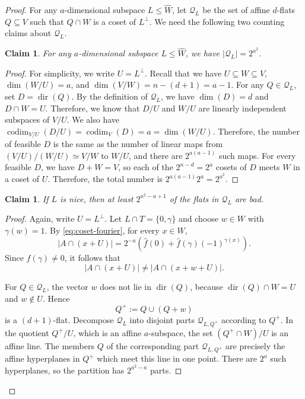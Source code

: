 \documentclass[reqno]{amsart}
\newtheorem{claim}[theorem]{Claim}
\theoremstyle{definition}
\theoremstyle{remark}
\newcommand{\cQ}{\mathcal Q}
\DeclareMathOperator{\dir}{dir}
\DeclareMathOperator{\codim}{codim}
\begin{document}
\begin{proof}
For any $a$-dimensional subspace $L\le\widehat W$, let $\cQ_L$ be the set of affine $d$-flats $Q\subseteq V$ such that $Q\cap W$ is a coset of $L^\perp$. We need the following two counting claims about $\cQ_L$.

\begin{claim}\label{claim:extensions}
For any $a$-dimensional subspace $L\le\widehat W$, we have $|\cQ_L|=2^{a^2}$.
\end{claim}

\begin{proof}
For simplicity, we write $U=L^\perp$. Recall that we have $U\subseteq W\subseteq V$,  $\dim(W/U)=a$, and $\dim(V/W)=n-(d+1)=a-1$. For any $Q\in\cQ_L$, set $D=\dir(Q)$. By the definition of $\cQ_L$, we have $\dim(D)=d$ and $D\cap W=U$. Therefore, we know that $D/U$ and $W/U$ are linearly independent subspaces of $V/U$. We also have $\codim_{V/U}(D/U)=\codim_V(D)=a=\dim(W/U)$. Therefore, the number of feasible $D$ is the same as the number of linear maps from $(V/U)/(W/U)\simeq V/W$ to $W/U$, and there are $2^{a(a-1)}$ such maps. For every feasible $D$,
we have $D+W=V$, so each of the $2^{n-d}=2^a$ cosets of $D$ meets $W$
in a coset of $U$. Therefore, the total number is $2^{a(a-1)}2^a=2^{a^2}$.
\end{proof}

\begin{claim}\label{claim:forced-bad}
If $L$ is nice, then at least
$2^{a^2-a+1}$ of the flats in $\cQ_L$ are bad.
\end{claim}


\begin{proof}
Again, write $U=L^\perp$. Let $L\cap T=\{0,\gamma\}$ and choose $w\in W$ with
$\gamma(w)=1$.  By \eqref{eq:coset-fourier}, for every $x\in W$,
\[
  |A\cap(x+U)|
  =2^{-a}\left(\widehat f(0)
      +\widehat f(\gamma)(-1)^{\gamma(x)}\right).
\]
Since $\widehat f(\gamma)\ne0$, it follows that
\begin{equation}\label{eq:unequal-cosets}
  |A\cap(x+U)|\ne|A\cap(x+w+U)|.
\end{equation}

For $Q\in\cQ_L$, the vector $w$ does not lie in $\dir(Q)$, because
$\dir(Q)\cap W=U$ and $w\notin U$.  Hence
\[Q^+:=Q\cup(Q+w)\]
is a $(d+1)$-flat. Decompose $\cQ_L$ into disjoint parts $\cQ_{L, Q^+}$ according to $Q^+$.  In the
quotient $Q^+/U$, which is an affine $a$-subspace, the set
$(Q^+\cap W)/U$ is an affine line.  The members $Q$ of the corresponding
part $\cQ_{L, Q^+}$ are precisely the affine hyperplanes in $Q^+$ which meet this line in one
point. There are $2^a$ such hyperplanes, so the partition has $2^{a^2-a}$ parts.


\end{proof}
\end{proof}
\end{document}
